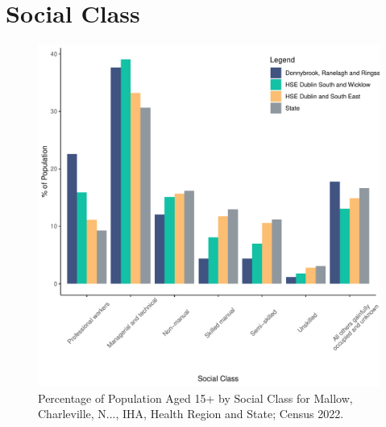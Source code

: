\documentclass{article}
\begin{document}
\section{Social Class}\label{sect:SC}
\begin{figure}[H]
	\centering
	\includegraphics[width = 140mm]{../figures/SocialClassED.pdf}
	\caption{Percentage of Population Aged 15+ by Social Class for Mallow, Charleville, N..., IHA, Health Region and State; Census 2022.}
	\label{fig:vbnv}
	\end{figure}
\end{document}
